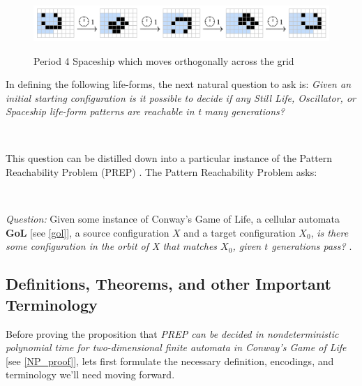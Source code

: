\documentclass{article}
\theoremstyle{definition}
\theoremstyle{plain}
\theoremstyle{plain}
\begin{document}
 \begin{figure}[ht]
          \centering
    \includegraphics[width=15cm]{figures/figure_four.png}
    \caption{Period 4 Spaceship which moves orthogonally across the grid}
    \cite{JG2022conway}
    \label{spaceship_figure}
\end{figure}


In defining the following life-forms, the next natural question to ask is: \textit{Given an initial starting configuration is it possible to decide if any Still Life, Oscillator, or Spaceship life-form patterns are reachable in t many generations?}

\

This question can be distilled down into a particular instance of the Pattern Reachability Problem (PREP) \cite{SUTNER199587}. The Pattern Reachability Problem asks: 

 \

 \textit{Question: } Given some instance of Conway's Game of Life, a cellular automata \textbf{GoL} [see \ref{gol}], a source configuration $X$ and a target configuration \textbf{$X_0$}, \textit{is there some configuration in the orbit of X that matches $X_0$, given $t$ generations pass?} \cite{SUTNER199587}.

\subsection{Definitions, Theorems, and other Important Terminology}
Before proving the proposition that 
\textit {PREP can be decided in nondeterministic polynomial time for two-dimensional finite automata in Conway's Game of Life} [see \ref{NP_proof}], lets first formulate the necessary definition, encodings, and terminology we'll need moving forward.
\end{document}
